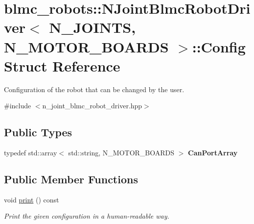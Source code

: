 \hypertarget{structblmc__robots_1_1NJointBlmcRobotDriver_1_1Config}{}\section{blmc\+\_\+robots\+:\+:N\+Joint\+Blmc\+Robot\+Driver$<$ N\+\_\+\+J\+O\+I\+N\+TS, N\+\_\+\+M\+O\+T\+O\+R\+\_\+\+B\+O\+A\+R\+DS $>$\+:\+:Config Struct Reference}
\label{structblmc__robots_1_1NJointBlmcRobotDriver_1_1Config}


Configuration of the robot that can be changed by the user.  




{\ttfamily \#include $<$n\+\_\+joint\+\_\+blmc\+\_\+robot\+\_\+driver.\+hpp$>$}

\subsection*{Public Types}
\begin{DoxyCompactItemize}
\item 
typedef std\+::array$<$ std\+::string, N\+\_\+\+M\+O\+T\+O\+R\+\_\+\+B\+O\+A\+R\+DS $>$ {\bfseries Can\+Port\+Array}\hypertarget{structblmc__robots_1_1NJointBlmcRobotDriver_1_1Config_a720d682f0f1a7d4052a3e2bed08926f8}{}\label{structblmc__robots_1_1NJointBlmcRobotDriver_1_1Config_a720d682f0f1a7d4052a3e2bed08926f8}

\end{DoxyCompactItemize}
\subsection*{Public Member Functions}
\begin{DoxyCompactItemize}
\item 
void \hyperlink{structblmc__robots_1_1NJointBlmcRobotDriver_1_1Config_a6cad2ea47acc09ddadec330e570e0958}{print} () const \hypertarget{structblmc__robots_1_1NJointBlmcRobotDriver_1_1Config_a6cad2ea47acc09ddadec330e570e0958}{}\label{structblmc__robots_1_1NJointBlmcRobotDriver_1_1Config_a6cad2ea47acc09ddadec330e570e0958}

\begin{DoxyCompactList}\small\item\em Print the given configuration in a human-\/readable way. \end{DoxyCompactList}\end{DoxyCompactItemize}
